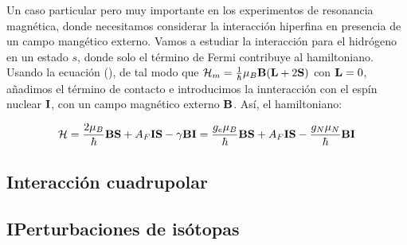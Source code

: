 Un caso particular pero muy importante en los experimentos de resonancia magnética, donde necesitamos considerar la interacción hiperfina en presencia de un campo mangético externo. Vamos a estudiar la interacción para el hidrógeno en un estado $s$, donde solo el término de Fermi contribuye al hamiltoniano. Usando la ecuación (), de tal modo que $\mathcal{H}_m = \frac{1}{\hbar} \mu_B \mathbf{B} (\mathbf{L}+2\mathbf{S})$ con $\mathbf{L}=0$, añadimos el término de contacto e introducimos la innteracción con el espín nuclear $\mathbf{I}$, con un campo magnético externo $\mathbf{B}$. Así, el hamiltoniano:

\begin{equation}
    \mathcal{H} = \frac{2\mu_B}{\hbar} \mathbf{B} \mathbf{S} + A_F \mathbf{I} \mathbf{S} - \gamma \mathbf{B} \mathbf{I} = \frac{g_e \mu_B}{\hbar} \mathbf{B} \mathbf{S} + A_F \mathbf{I} \mathbf{S} - \frac{g_N \mu_N}{\hbar} \mathbf{B} \mathbf{I}
\end{equation}


\subsection{Interacción cuadrupolar}

\subsection{IPerturbaciones de isótopas}



